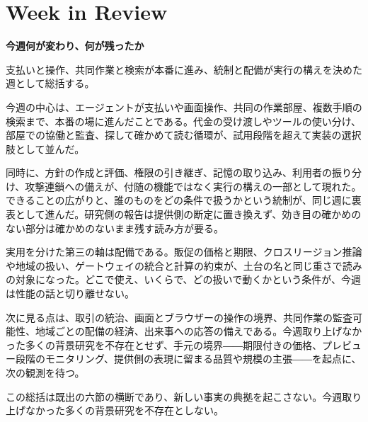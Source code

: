 \section{Week in Review}
\begin{wideflow}
{\Large\bfseries 今週何が変わり、何が残ったか}\par
\smallskip
{\color{SurveyMuted}支払いと操作、共同作業と検索が本番に進み、統制と配備が実行の構えを決めた週として総括する。}\par
\end{wideflow}

\noindent 今週の中心は、エージェントが支払いや画面操作、共同の作業部屋、複数手順の検索まで、本番の場に進んだことである。代金の受け渡しやツールの使い分け、部屋での協働と監査、探して確かめて読む循環が、試用段階を超えて実装の選択肢として並んだ。 \cite{w2026w34w34eventc010,w2026w34w34eventc012,w2026w34w34eventc019}\par\medskip

\noindent 同時に、方針の作成と評価、権限の引き継ぎ、記憶の取り込み、利用者の振り分け、攻撃連鎖への備えが、付随の機能ではなく実行の構えの一部として現れた。できることの広がりと、誰のものをどの条件で扱うかという統制が、同じ週に裏表として進んだ。研究側の報告は提供側の断定に置き換えず、効き目の確かめのない部分は確かめのないまま残す読み方が要る。 \cite{w2026w34w34eventc087,w2026w34w34eventc004,w2026w34w34eventc055}\par\medskip

\noindent 実用を分けた第三の軸は配備である。販促の価格と期限、クロスリージョン推論や地域の扱い、ゲートウェイの統合と計算の約束が、土台の名と同じ重さで読みの対象になった。どこで使え、いくらで、どの扱いで動くかという条件が、今週は性能の話と切り離せない。 \cite{w2026w34w34eventc017,w2026w34w34eventc030,w2026w34w34eventc003}\par\medskip

\noindent 次に見る点は、取引の統治、画面とブラウザーの操作の境界、共同作業の監査可能性、地域ごとの配備の経済、出来事への応答の備えである。今週取り上げなかった多くの背景研究を不存在とせず、手元の境界――期限付きの価格、プレビュー段階のモニタリング、提供側の表現に留まる品質や規模の主張――を起点に、次の観測を待つ。 \cite{w2026w34w34eventc026,w2026w34w34eventc008,w2026w34w34eventc091}\par\medskip

\begin{claimboundary}[この総括の読み方]
この総括は既出の六節の横断であり、新しい事実の典拠を起こさない。今週取り上げなかった多くの背景研究を不存在としない。
\end{claimboundary}
